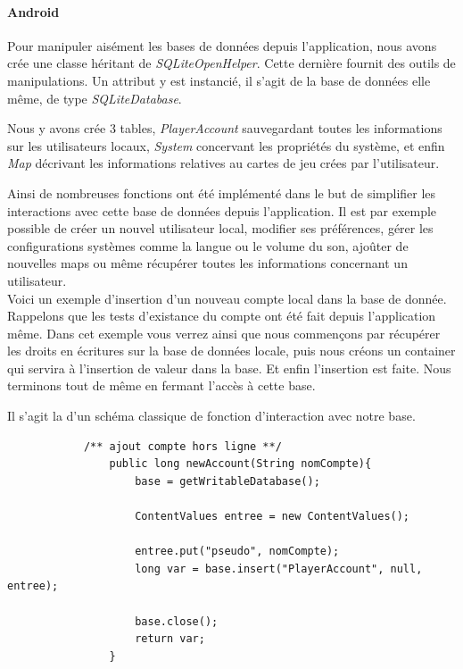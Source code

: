 		\paragraph{Android\\}
			
			Pour manipuler aisément les bases de données depuis l'application,
			nous avons crée une classe héritant de \textit{SQLiteOpenHelper}. Cette
			dernière fournit des outils de manipulations. Un attribut y est
			instancié, il s'agit de la base de données elle même, de type
			\textit{SQLiteDatabase}.
			
			Nous y avons crée 3 tables, \textit{PlayerAccount} sauvegardant toutes les
			informations sur les utilisateurs locaux, \textit{System} concervant les
			propriétés du système, et enfin \textit{Map} décrivant les informations
			relatives au cartes de jeu crées par l'utilisateur.
			
			Ainsi de nombreuses	fonctions ont été implémenté dans le but de simplifier les interactions
			avec cette base de données depuis l'application. Il est par exemple possible de créer un nouvel 
			utilisateur local, modifier ses préférences, gérer les configurations systèmes comme la langue ou le volume
			du son, ajoûter de nouvelles maps ou même récupérer toutes les informations
			concernant un utilisateur.\\
			
			Voici un exemple d'insertion d'un nouveau compte local dans la base de
			donnée. Rappelons que les tests d'existance du compte ont été fait depuis
			l'application même. Dans cet exemple vous verrez ainsi que nous commençons
			par récupérer les droits en écritures sur la base de données locale, puis
			nous créons un container qui servira à l'insertion de valeur dans la base. Et
			enfin l'insertion est faite. Nous terminons tout de même en fermant l'accès à
			cette base.
			
			Il s'agit la d'un schéma classique de fonction d'interaction avec notre
			base.
						
			\begin{verbatim}
			/** ajout compte hors ligne **/
				public long newAccount(String nomCompte){
					base = getWritableDatabase();
			
					ContentValues entree = new ContentValues();
					
					entree.put("pseudo", nomCompte);
					long var = base.insert("PlayerAccount", null, entree);
					
					base.close();
					return var;
				}
			\end{verbatim}

